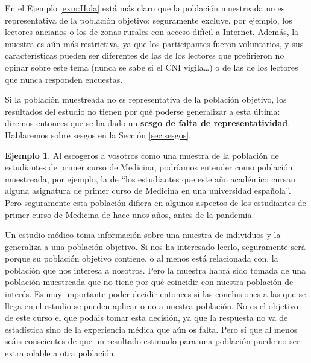 \documentclass[
]{book}
\theoremstyle{definition}
\theoremstyle{definition}
\newtheorem{example}{Ejemplo}[chapter]
\theoremstyle{definition}
\theoremstyle{definition}
\theoremstyle{remark}
\begin{document}
En el Ejemplo \ref{exm:Hola} está más claro que la población muestreada no es representativa de la población objetivo: seguramente excluye, por ejemplo, los lectores ancianos o los de zonas rurales con acceso difícil a Internet. Además, la muestra es aún más restrictiva, ya que los participantes fueron voluntarios, y sus características pueden ser diferentes de las de los lectores que prefirieron no opinar sobre este tema (nunca se sabe si el CNI vigila\ldots) o de las de los lectores que nunca responden encuestas.

Si la población muestreada no es representativa de la población objetivo, los resultados del estudio no tienen por qué poderse generalizar a esta última: diremos entonces que se ha dado un \textbf{sesgo de falta de representatividad}. Hablaremos sobre sesgos en la Sección \ref{sec:sesgos}.

\begin{example}
\protect\hypertarget{exm:unnamed-chunk-60}{}\label{exm:unnamed-chunk-60}Al escogeros a vosotros como una muestra de la población de estudiantes de primer curso de Medicina, podríamos entender como población muestreada, por ejemplo, la de ``los estudiantes que este año académico cursan alguna asignatura de primer curso de Medicina en una universidad española''. Pero seguramente esta población difiera en algunos aspectos de los estudiantes de primer curso de Medicina de hace unos años, antes de la pandemia.
\end{example}

Un estudio médico toma información sobre una muestra de individuos y la generaliza a una población objetivo. Si nos ha interesado leerlo, seguramente será porque su población objetivo contiene, o al menos está relacionada con, la población que nos interesa a nosotros. Pero la muestra habrá sido tomada de una población muestreada que no tiene por qué coincidir con nuestra población de interés. Es muy importante poder decidir entonces si las conclusiones a las que se llega en el estudio se pueden aplicar o no a nuestra población. No es el objetivo de este curso el que podáis tomar esta decisión, ya que la respuesta no va de estadística sino de la experiencia médica que aún os falta. Pero sí que al menos seáis conscientes de que un resultado estimado para una población puede no ser extrapolable a otra población.
\end{document}
